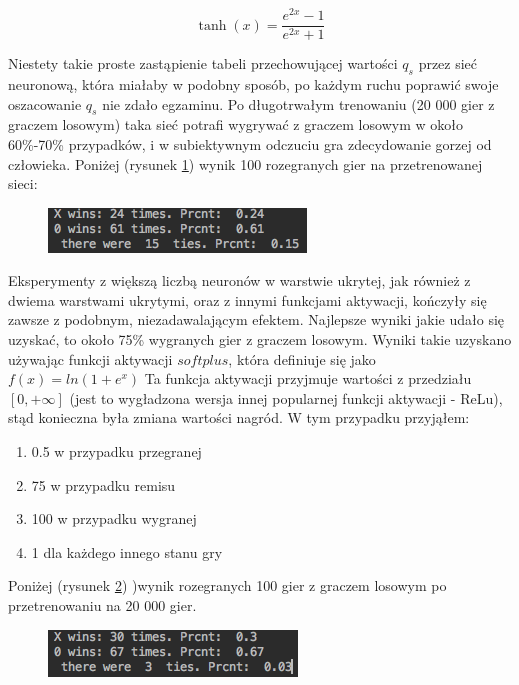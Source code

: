 \documentclass[licencjacka]{pracamgr}
\begin{document}
\begin{equation}
	\tanh(x) = \frac{e^{2x} - 1}{e^{2x} + 1}
\end{equation}

Niestety takie proste zastąpienie tabeli przechowującej wartości $q_{s}$ przez sieć neuronową, która miałaby w podobny sposób, po każdym ruchu poprawić swoje oszacowanie $q_{s}$ nie zdało egzaminu. Po długotrwałym trenowaniu (20 000 gier z graczem losowym) taka sieć potrafi wygrywać z graczem losowym w około 60\%-70\% przypadków, i w subiektywnym odczuciu gra zdecydowanie gorzej od człowieka.  Poniżej (rysunek \ref{Rys25}) wynik 100 rozegranych gier na przetrenowanej sieci:

\begin{figure}[h!]
	\includegraphics [scale=0.8]{nn_I_tanh.png}
	\caption{}
	\label{Rys25}
\end{figure}

Eksperymenty z większą liczbą neuronów w warstwie ukrytej, jak również z dwiema warstwami ukrytymi, oraz z innymi funkcjami aktywacji, kończyły się zawsze z podobnym, niezadawalającym efektem. Najlepsze wyniki jakie udało się uzyskać, to około 75\% wygranych gier z graczem losowym. Wyniki takie uzyskano używając funkcji aktywacji $softplus$, która definiuje się jako  $f(x) = ln(1+e^{x})$ Ta funkcja aktywacji przyjmuje wartości z przedziału $[0,+\infty]$  (jest to wygładzona wersja innej popularnej funkcji aktywacji -  ReLu), stąd konieczna była zmiana wartości nagród. W tym przypadku przyjąłem:

\begin{enumerate}
	\item{0.5 w przypadku przegranej}
	\item{75 w przypadku remisu }
	\item{100 w przypadku wygranej}
	\item{1 dla każdego innego stanu gry}
\end{enumerate}

Poniżej (rysunek \ref{Rys26}) )wynik rozegranych 100 gier z graczem losowym po przetrenowaniu na 20 000 gier.

\begin{figure}[h!]
	\includegraphics [scale=0.8]{nn_I_softplus.png}
	\caption{}
	\label{Rys26}
\end{figure}
\end{document}
